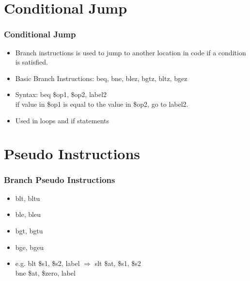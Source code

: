 \documentclass[
	10pt, %
	hmargin=1cm,vmargin=0cm,head=0.5cm,headsep=0pt,foot=0.5cm,margin=2cm
]{beamer}
\begin{document}
\section{Conditional Jump} 
\begin{frame}
	\frametitle{Conditional Jump}
	\begin{itemize}
		\item Branch instructions is used to jump to another location in code if a condition is satisfied. \pause
		\item Basic Branch Instructions: \color{blue}beq\color{black}, \color{blue}bne\color{black}, \color{blue}blez\color{black}, \color{blue}bgtz\color{black}, \color{blue}bltz\color{black}, \color{blue}bgez\color{black} \pause
		\item Syntax: \color{blue}beq \color{red}\$op1\color{black}, \color{red}\$op2\color{black}, label2 \\ 
			\hspace{1.2cm} if value in \color{red}\$op1\color{black} is equal to the value in \color{red}\$op2\color{black}, go to label2.
		\item Used in loops and if statements
	\end{itemize}
\end{frame}

\section{Pseudo Instructions}
\begin{frame}
	\frametitle{Branch Pseudo Instructions}
	\begin{itemize}
		\item blt, bltu
		\item ble, bleu
		\item bgt, bgtu
		\item bge, bgeu
		\item e.g. \color{blue}blt \color{red}\$s1\color{black}, \color{red}\$s2\color{black}, label 	\( \Rightarrow \) 	\color{blue}slt \color{red}\$at\color{black}, \color{red}\$s1\color{black}, \color{red}\$s2\color{black} \\ 
		\hspace{3.9cm} \color{blue}bne \color{red}\$at\color{black}, \color{red}\$zero\color{black}, label
	\end{itemize}
\end{frame}
\end{document}
